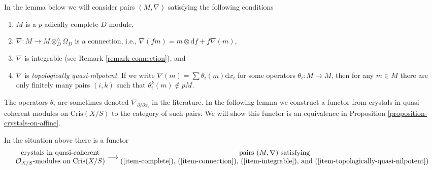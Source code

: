 \noindent
In the lemma below we will consider pairs $(M, \nabla)$ satisfying the
following conditions
\begin{enumerate}
\item
\label{item-complete}
$M$ is a $p$-adically complete $D$-module,
\item
\label{item-connection}
$\nabla : M \to M \otimes^\wedge_D \Omega_D$ is a connection, i.e.,
$\nabla(fm) = m \otimes \text{d}f + f\nabla(m)$,
\item
\label{item-integrable}
$\nabla$ is integrable
(see Remark \ref{remark-connection}), and
\item
\label{item-topologically-quasi-nilpotent}
$\nabla$ is {\it topologically quasi-nilpotent}: If we write
$\nabla(m) = \sum \theta_i(m)\text{d}x_i$ for some operators
$\theta_i : M \to M$, then for any $m \in M$ there are only finitely
many pairs $(i, k)$ such that $\theta_i^k(m) \not \in pM$.
\end{enumerate}
The operators $\theta_i$ are sometimes denoted
$\nabla_{\partial/\partial x_i}$ in the literature.
In the following lemma we construct a functor from crystals in quasi-coherent
modules on $\text{Cris}(X/S)$ to the category of such pairs. We will show
this functor is an equivalence in
Proposition \ref{proposition-crystals-on-affine}.

\begin{lemma}
\label{lemma-crystals-on-affine}
In the situation above there is a functor
$$
\begin{matrix}
\text{crystals in quasi-coherent} \\
\mathcal{O}_{X/S}\text{-modules on }\text{Cris}(X/S)
\end{matrix}
\longrightarrow
\begin{matrix}
\text{pairs }(M, \nabla)\text{ satisfying} \\
\text{(\ref{item-complete}), (\ref{item-connection}),
(\ref{item-integrable}), and (\ref{item-topologically-quasi-nilpotent})}
\end{matrix}
$$
\end{lemma}

